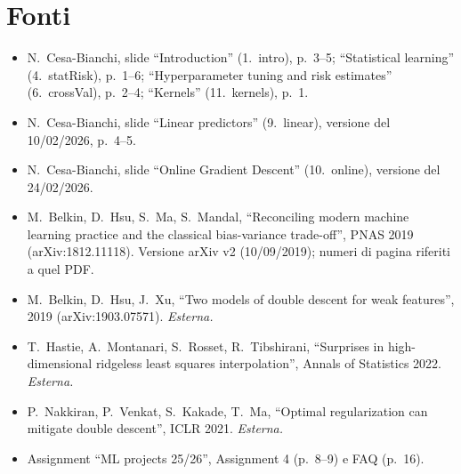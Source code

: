 \documentclass[11pt,a4paper]{article}
\begin{document}
\section{Fonti}
\begin{itemize}
  \item N.\ Cesa-Bianchi, slide ``Introduction'' (1.\ intro), p.~3--5; ``Statistical learning'' (4.\ statRisk), p.~1--6;
        ``Hyperparameter tuning and risk estimates'' (6.\ crossVal), p.~2--4; ``Kernels'' (11.\ kernels), p.~1.
  \item N.\ Cesa-Bianchi, slide ``Linear predictors'' (9.\ linear), versione del 10/02/2026, p.~4--5.
  \item N.\ Cesa-Bianchi, slide ``Online Gradient Descent'' (10.\ online), versione del 24/02/2026.
  \item M.\ Belkin, D.\ Hsu, S.\ Ma, S.\ Mandal, ``Reconciling modern machine learning practice and the classical
        bias-variance trade-off'', PNAS 2019 (arXiv:1812.11118). Versione arXiv v2 (10/09/2019); numeri di pagina riferiti a quel PDF.
  \item M.\ Belkin, D.\ Hsu, J.\ Xu, ``Two models of double descent for weak features'', 2019 (arXiv:1903.07571). \emph{Esterna.}
  \item T.\ Hastie, A.\ Montanari, S.\ Rosset, R.\ Tibshirani, ``Surprises in high-dimensional ridgeless least squares
        interpolation'', Annals of Statistics 2022. \emph{Esterna.}
  \item P.\ Nakkiran, P.\ Venkat, S.\ Kakade, T.\ Ma, ``Optimal regularization can mitigate double descent'', ICLR 2021. \emph{Esterna.}
  \item Assignment ``ML projects 25/26'', Assignment 4 (p.~8--9) e FAQ (p.~16).
\end{itemize}
\end{document}
